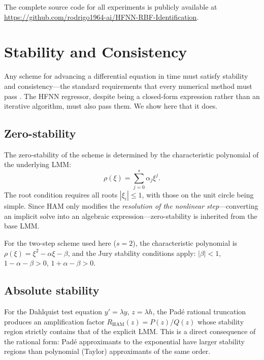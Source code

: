 \documentclass[preprint,12pt]{elsarticle}
\begin{document}
The complete source code for all experiments is publicly available at \url{https://github.com/rodrigo1964-ai/HFNN-RBF-Identification}.


\section{Stability and Consistency}
\label{sec:stability}

Any scheme for advancing a differential equation in time must satisfy stability and consistency---the standard requirements that every numerical method must pass \cite{butcher2016, dahlquist1956}. The HFNN regressor, despite being a closed-form expression rather than an iterative algorithm, must also pass them. We show here that it does.

\subsection{Zero-stability}
The zero-stability of the scheme is determined by the characteristic polynomial of the underlying LMM:
\begin{equation}
\rho(\xi) = \sum_{j=0}^{s} \alpha_j \xi^j.
\label{eq:char_poly}
\end{equation}
The root condition requires all roots $|\xi_i| \le 1$, with those on the unit circle being simple. Since HAM only modifies the \emph{resolution of the nonlinear step}---converting an implicit solve into an algebraic expression---zero-stability is inherited from the base LMM.

For the two-step scheme used here ($s=2$), the characteristic polynomial is $\rho(\xi) = \xi^2 - \alpha\xi - \beta$, and the Jury stability conditions apply: $|\beta| < 1$, $1 - \alpha - \beta > 0$, $1 + \alpha - \beta > 0$.

\subsection{Absolute stability}
For the Dahlquist test equation $y' = \lambda y$, $z = \lambda h$, the Pad\'e rational truncation produces an amplification factor $R_{\mathrm{HAM}}(z) = P(z)/Q(z)$ whose stability region strictly contains that of the explicit LMM. This is a direct consequence of the rational form: Pad\'e approximants to the exponential have larger stability regions than polynomial (Taylor) approximants of the same order.
\end{document}
